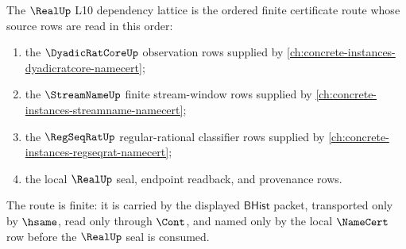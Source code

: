 \begin{definition}
\label{def:real-l10-dependency-lattice}
The $\RealUp$ L10 dependency lattice is the ordered finite certificate route
whose source rows are read in this order:
\begin{enumerate}
\item the $\DyadicRatCoreUp$ observation rows supplied by
  \autoref{ch:concrete-instances-dyadicratcore-namecert};
\item the $\StreamNameUp$ finite stream-window rows supplied by
  \autoref{ch:concrete-instances-streamname-namecert};
\item the $\RegSeqRatUp$ regular-rational classifier rows supplied by
  \autoref{ch:concrete-instances-regseqrat-namecert};
\item the local $\RealUp$ seal, endpoint readback, and provenance rows.
\end{enumerate}
The route is finite: it is carried by the displayed $\mathsf{BHist}$ packet,
transported only by $\hsame$, read only through $\Cont$, and named only by the
local $\NameCert$ row before the $\RealUp$ seal is consumed.
\end{definition}

